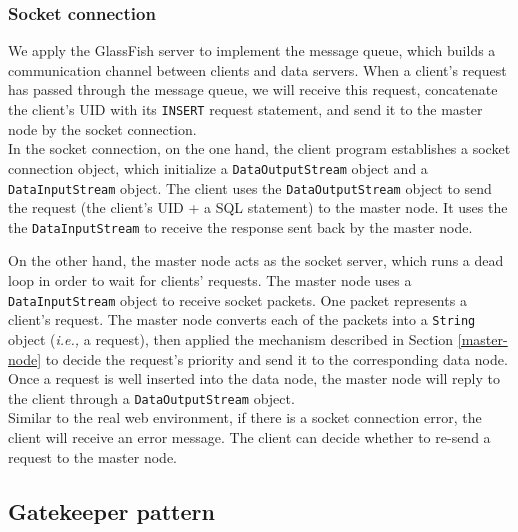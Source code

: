 \documentclass{article}
\begin{document}
\subsubsection{Socket connection}
We apply the GlassFish server to implement the message queue, which builds a communication channel between clients and data servers. When a client's request has passed through the message queue, we will receive this request, concatenate the client's UID with its \texttt{INSERT} request statement, and send it to the master node by the socket connection.\\

In the socket connection, on the one hand, the client program establishes a socket connection object, which initialize a \texttt{DataOutputStream} object and a \texttt{DataInputStream} object. The client uses the \texttt{DataOutputStream} object to send the request (the client's UID + a SQL statement) to the master node. It uses the the \texttt{DataInputStream} to receive the response sent back by the master node.

On the other hand, the master node acts as the socket server, which runs a dead loop in order to wait for clients' requests. The master node uses a \texttt{DataInputStream} object to receive socket packets. One packet represents a client's request. The master node converts each of the packets into a \texttt{String} object (\emph{i.e.,} a request), then applied the mechanism described in Section \ref{master-node} to decide the request's priority and send it to the corresponding data node. Once a request is well inserted into the data node, the master node will reply to the client through a \texttt{DataOutputStream} object.\\

Similar to the real web environment, if there is a socket connection error, the client will receive an error message. The client can decide whether to re-send a request to the master node.

\subsection{Gatekeeper pattern}
\end{document}
